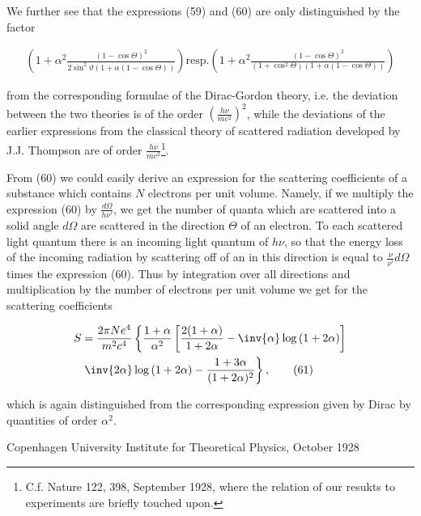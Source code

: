 \documentclass{article}
\newcommand{\nequ}[2]{
\begin{align*}
#1
\tag{#2}
\end{align*}
}
\newcommand{\uequ}[1]{
\begin{align*}
#1
\end{align*}
}
\begin{document}
We further see that the expressions (59) and (60) are only distinguished by the factor
\uequ{
\left(1 + \alpha^2\frac{(1-\cos\Theta)^2}{2\sin^2\vartheta\left(1+\alpha(1-\cos\Theta)\right)}\right)
\text{resp.}
\left(1 + \alpha^2\frac{(1-\cos\Theta)^2}{(1+\cos^2\Theta)\left(1+\alpha(1-\cos\Theta)\right)}\right)
}
from the corresponding formulae of the Dirac-Gordon theory, i.e. the deviation between the two theories is of the order $\left(\frac{h\nu}{mc^2}\right)^2$, while the deviations of the earlier expressions from the classical theory of scattered radiation developed by J.J. Thompson are of order $\frac{h\nu}{mc^2}$\footnote{C.f. Nature 122, 398, September 1928, where the relation of our resukts to experiments are briefly touched upon.}.

From (60) we could easily derive an expression for the scattering coefficients of a substance which contains $N$ electrons per unit volume. Namely, if we multiply the expression (60) by $\frac{{d\Omega}}{h\nu'}$, we get the number of quanta which are scattered into a solid angle ${d\Omega}$ are scattered in the direction $\Theta$ of an electron. To each scattered light quantum there is an incoming light quantum of  $h\nu$, so that the energy loss of the incoming radiation by scattering off of an in this direction is equal to $\frac{\nu}{\nu'}{d\Omega}$ times the expression (60). Thus by integration over all directions and multiplication by the number of electrons per unit volume we get for the scattering coefficients
\nequ{
S &= \frac{2\pi N e^4}{m^2c^4}\left\{\frac{1+\alpha}{\alpha^2}\left[
\frac{2(1+\alpha)}{1+2\alpha} - \inv{\alpha}\log{(1+2\alpha)}\right]\right.\\
&\left. \inv{2\alpha}\log{(1+2\alpha)} - \frac{1+3\alpha}{(1+2\alpha)^2}\right\},
}{61}
which is again distinguished from the corresponding expression given by Dirac by quantities of order $\alpha^2$.

Copenhagen University Institute for Theoretical Physics, October 1928
\end{document}

